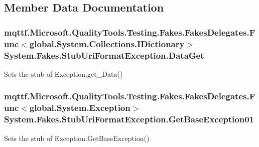 \subsection{Member Data Documentation}
\hypertarget{class_system_1_1_fakes_1_1_stub_uri_format_exception_afa04371510dfba3e73ee1674492c7ec0}{
\subsubsection[{Data\-Get}]{\setlength{\rightskip}{0pt plus 5cm}mqttf.\-Microsoft.\-Quality\-Tools.\-Testing.\-Fakes.\-Fakes\-Delegates.\-Func$<$global.\-System.\-Collections.\-I\-Dictionary$>$ System.\-Fakes.\-Stub\-Uri\-Format\-Exception.\-Data\-Get}}\label{class_system_1_1_fakes_1_1_stub_uri_format_exception_afa04371510dfba3e73ee1674492c7ec0}


Sets the stub of Exception.\-get\-\_\-\-Data()

\hypertarget{class_system_1_1_fakes_1_1_stub_uri_format_exception_af3733f79e0c50e8c3f10f616218745c5}{
\subsubsection[{Get\-Base\-Exception01}]{\setlength{\rightskip}{0pt plus 5cm}mqttf.\-Microsoft.\-Quality\-Tools.\-Testing.\-Fakes.\-Fakes\-Delegates.\-Func$<$global.\-System.\-Exception$>$ System.\-Fakes.\-Stub\-Uri\-Format\-Exception.\-Get\-Base\-Exception01}}\label{class_system_1_1_fakes_1_1_stub_uri_format_exception_af3733f79e0c50e8c3f10f616218745c5}


Sets the stub of Exception.\-Get\-Base\-Exception()

